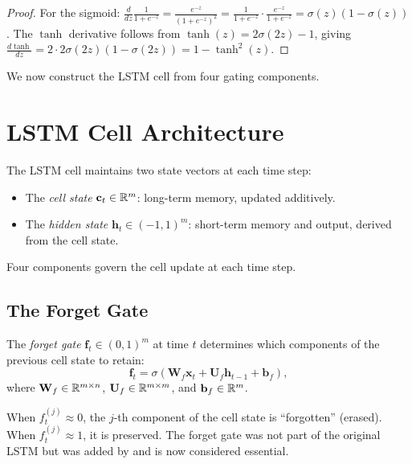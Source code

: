 \documentclass[11pt,a4paper]{article}
\begin{document}
\begin{proof}
For the sigmoid:
$\frac{d}{dz}\frac{1}{1+e^{-z}} = \frac{e^{-z}}{(1+e^{-z})^2}
= \frac{1}{1+e^{-z}} \cdot \frac{e^{-z}}{1+e^{-z}}
= \sigma(z)(1 - \sigma(z))$.
The $\tanh$ derivative follows from
$\tanh(z) = 2\sigma(2z) - 1$, giving
$\frac{d\tanh}{dz} = 2 \cdot 2\sigma(2z)(1-\sigma(2z)) =
1 - \tanh^2(z)$.
\end{proof}

We now construct the LSTM cell from four gating components.

\section{LSTM Cell Architecture}
\label{sec:lstm-cell}

The LSTM cell maintains two state vectors at each time step:
\begin{itemize}[nosep]
  \item The \emph{cell state} $\mathbf{c}_t \in \mathbb{R}^m$: long-term
    memory, updated additively.
  \item The \emph{hidden state} $\mathbf{h}_t \in (-1, 1)^m$:
    short-term memory and output, derived from the cell state.
\end{itemize}
Four components govern the cell update at each time step.

\subsection{The Forget Gate}

\begin{definition}
\label{def:forget-gate}
The \emph{forget gate} $\mathbf{f}_t \in (0, 1)^m$ at time $t$
determines which components of the previous cell state to retain:
\begin{equation}
  \boxed{\mathbf{f}_t = \sigma(\mathbf{W}_f \mathbf{x}_t +
    \mathbf{U}_f \mathbf{h}_{t-1} + \mathbf{b}_f)},
  \label{eq:forget-gate}
\end{equation}
where $\mathbf{W}_f \in \mathbb{R}^{m \times n}$,
$\mathbf{U}_f \in \mathbb{R}^{m \times m}$, and
$\mathbf{b}_f \in \mathbb{R}^m$.
\end{definition}

\begin{remark}[Interpretation]
When $f_t^{(j)} \approx 0$, the $j$-th component of the cell state
is ``forgotten'' (erased).  When $f_t^{(j)} \approx 1$, it is
preserved.  The forget gate was not part of the original LSTM
\citep{hochreiter1997} but was added by \citet{gers2000} and is now
considered essential.
\end{remark}
\end{document}
